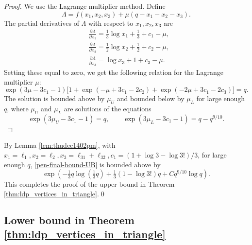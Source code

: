 \documentclass[bj,authoryear,noshowframe]{imsart}
\numberwithin{equation}{section}
\theoremstyle{plain}
\theoremstyle{definition}
\begin{document}
\begin{proof}
We use the Lagrange multiplier method. Define
	\begin{equation}
	\Lambda = f(x_1,x_2,x_3) + \mu (q-x_1-x_2-x_3).
	\end{equation}
The partial derivatives of $\Lambda$ with respect to $x_1,x_2,x_3$ are
	\begin{equation}
	\begin{aligned}
	&\frac{\partial \Lambda}{\partial x_1} = \tfrac{1}{3} \log{x_1} + \tfrac{1}{3} + c_1 - \mu, \\
	&\frac{\partial \Lambda}{\partial x_2} = \tfrac{1}{2} \log{x_2} + \tfrac{1}{2} + c_2 - \mu, \\
	&\frac{\partial \Lambda}{\partial x_3} = \log{x_3} + 1 + c_3 - \mu.
	\end{aligned}
	\end{equation}
Setting these equal to zero, we get the following relation for the Lagrange multiplier $\mu$:
	\begin{equation}
	\exp(3\mu-3c_1-1)\Big[1+\exp(-\mu+3c_1-2c_2)+ \exp(-2\mu+3c_1-2c_3)\Big] = q.
	\end{equation}
The solution is bounded above by $\mu_U$ and bounded below by $\mu_L$ for large enough $q$, where $\mu_U$ and $\mu_L$ are solutions of the equations
	\begin{equation}
	\exp(3\mu_U-3c_1-1) = q, \qquad \exp(3\mu_L-3c_1-1) = q-q^{9/10}.
	\end{equation}
	\end{proof}

By Lemma \ref{lem:thudec1402pm}, with $x_1=\ell_1, x_2=\ell_2, x_3=\ell_{31}+\ell_{32}, c_1=(1+\log{3}-\log{3!})/3$, for large enough $q$, \eqref{pen-final-bound-UB} is bounded above by 
	\begin{equation}
	\label{eqn:thudec221128pm}
	\exp\left(-\tfrac13 q\log(\tfrac13 q) + \tfrac13 (1-\log{3!}) q + Cq^{9/10}\log{q}\right).
	\end{equation}
This completes the proof of the upper bound in Theorem \ref{thm:ldp_vertices_in_triangle}.\qed


\subsection{Lower bound in Theorem \ref{thm:ldp_vertices_in_triangle}}
\label{sec:lb}
\end{document}
